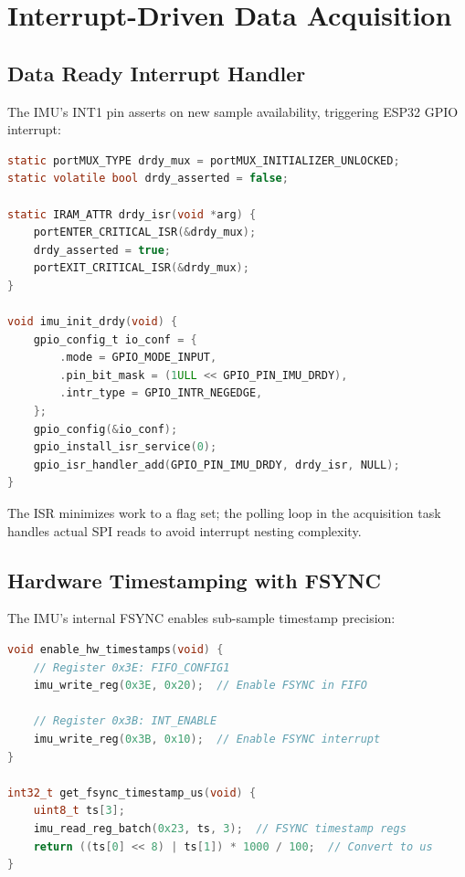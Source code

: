 \section{Interrupt-Driven Data Acquisition}

\subsection{Data Ready Interrupt Handler}

The IMU's INT1 pin asserts on new sample availability, triggering ESP32 GPIO interrupt:

\begin{lstlisting}[language=c]
static portMUX_TYPE drdy_mux = portMUX_INITIALIZER_UNLOCKED;
static volatile bool drdy_asserted = false;

static IRAM_ATTR drdy_isr(void *arg) {
    portENTER_CRITICAL_ISR(&drdy_mux);
    drdy_asserted = true;
    portEXIT_CRITICAL_ISR(&drdy_mux);
}

void imu_init_drdy(void) {
    gpio_config_t io_conf = {
        .mode = GPIO_MODE_INPUT,
        .pin_bit_mask = (1ULL << GPIO_PIN_IMU_DRDY),
        .intr_type = GPIO_INTR_NEGEDGE,
    };
    gpio_config(&io_conf);
    gpio_install_isr_service(0);
    gpio_isr_handler_add(GPIO_PIN_IMU_DRDY, drdy_isr, NULL);
}
\end{lstlisting}

The ISR minimizes work to a flag set; the polling loop in the acquisition task handles actual SPI reads to avoid interrupt nesting complexity.

\subsection{Hardware Timestamping with FSYNC}

The IMU's internal FSYNC enables sub-sample timestamp precision:

\begin{lstlisting}[language=c]
void enable_hw_timestamps(void) {
    // Register 0x3E: FIFO_CONFIG1
    imu_write_reg(0x3E, 0x20);  // Enable FSYNC in FIFO

    // Register 0x3B: INT_ENABLE
    imu_write_reg(0x3B, 0x10);  // Enable FSYNC interrupt
}

int32_t get_fsync_timestamp_us(void) {
    uint8_t ts[3];
    imu_read_reg_batch(0x23, ts, 3);  // FSYNC timestamp regs
    return ((ts[0] << 8) | ts[1]) * 1000 / 100;  // Convert to us
}
\end{lstlisting}

